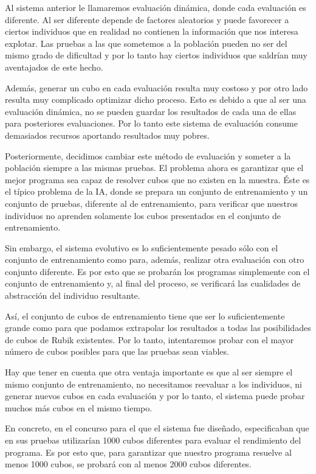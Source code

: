 Al sistema anterior le llamaremos evaluación dinámica, donde cada evaluación es
diferente. Al ser diferente depende de factores aleatorios y puede favorecer a
ciertos individuos que en realidad no contienen la información que nos interesa
explotar. Las pruebas a las que sometemos a la población pueden no ser del mismo
grado de dificultad y por lo tanto hay ciertos individuos que saldrían muy
aventajados de este hecho.

Además, generar un cubo en cada evaluación resulta muy costoso y por otro lado
resulta muy complicado optimizar dicho proceso. Esto es debido a que al ser una
evaluación dinámica, no se pueden guardar los resultados de cada una de ellas
para posteriores evaluaciones. Por lo tanto este sistema de evaluación consume
demasiados recursos aportando resultados muy pobres.

Posteriormente, decidimos cambiar este método de evaluación y someter a la
población siempre a las mismas pruebas. El problema ahora es garantizar que el
mejor programa sea capaz de resolver cubos que no existen en la muestra. Éste es
el típico problema de la IA, donde se prepara un conjunto de entrenamiento y un
conjunto de pruebas, diferente al de entrenamiento, para verificar que nuestros
individuos no aprenden solamente los cubos presentados en el conjunto de
entrenamiento.

Sin embargo, el sistema evolutivo es lo suficientemente pesado sólo con el
conjunto de entrenamiento como para, además, realizar otra evaluación con otro
conjunto diferente. Es por esto que se probarán los programas simplemente con el
conjunto de entrenamiento y, al final del proceso, se verificará las cualidades
de abstracción del individuo resultante.

Así, el conjunto de cubos de entrenamiento tiene que ser lo suficientemente
grande como para que podamos extrapolar los resultados a todas las posibilidades
de cubos de Rubik existentes. Por lo tanto, intentaremos probar con el mayor
número de cubos posibles para que las pruebas sean viables.

Hay que tener en cuenta que otra ventaja importante es que al ser siempre el
mismo conjunto de entrenamiento, no necesitamos reevaluar a los individuos, ni
generar nuevos cubos en cada evaluación y por lo tanto, el sistema puede probar
muchos más cubos en el mismo tiempo.

En concreto, en el concurso para el que el sistema fue diseñado, especificaban
que en sus pruebas utilizarían 1000 cubos diferentes para evaluar el rendimiento
del programa. Es por esto que, para garantizar que nuestro programa resuelve al
menos 1000 cubos, se probará con al menos 2000 cubos diferentes.


